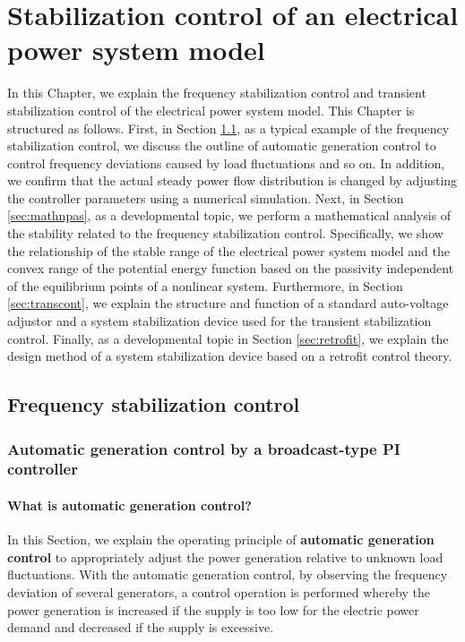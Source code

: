 \documentclass[graybox, envcountchap]{svmult}
\begin{document}
\chapter{Stabilization control of an electrical power system model}\label{ch:stabcont}

In this Chapter, we explain the frequency stabilization control and transient stabilization control of the electrical power system model.
This Chapter is structured as follows. First, in Section \ref{sec:agcover}, as a typical example of the frequency stabilization control, we discuss the outline of automatic generation control to control frequency deviations caused by load fluctuations and so on.
In addition, we confirm that the actual steady power flow distribution is changed by adjusting the controller parameters using a numerical simulation.
Next, in Section \ref{sec:mathnpas}, as a developmental topic, we perform a mathematical analysis of the stability related to the frequency stabilization control.
Specifically, we show the relationship of the stable range of the electrical power system model and the convex range of the potential energy function based on the passivity independent of the equilibrium points of a nonlinear system.
Furthermore, in Section \ref{sec:transcont}, we explain the structure and function of a standard auto-voltage adjustor and a system stabilization device used for the transient stabilization control.
Finally, as a developmental topic in Section \ref{sec:retrofit}, we explain the design method of a system stabilization device based on a retrofit control theory.


\section{Frequency stabilization control}\label{sec:agcover}
\subsection{Automatic generation control by a broadcast-type PI controller}\label{sec:broadPI}


\smallskip
\subsubsection{What is automatic generation control?}

In this Section, we explain the operating principle of \textbf{automatic generation control} to appropriately adjust the power generation relative to unknown load fluctuations.
With the automatic generation control, by observing the frequency deviation of several generators, a control operation is performed whereby the power generation is increased if the supply is too low for the electric power demand and decreased if the supply is excessive.
\end{document}
